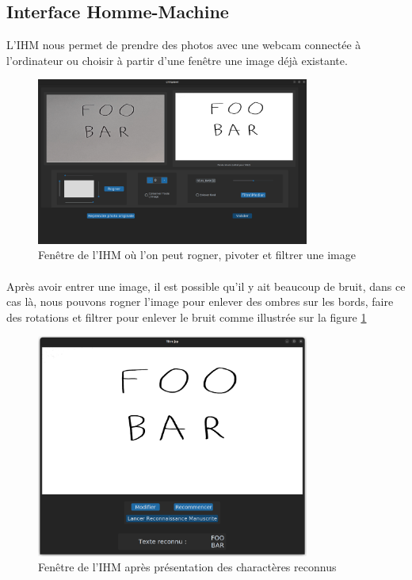 \documentclass[a4paper]{article}
\begin{document}
		\subsection{Interface Homme-Machine}
			L'IHM nous permet de prendre des photos avec une webcam connectée à l'ordinateur ou choisir à partir d'une fenêtre une image déjà existante. 
			\begin{figure}[H]
				\includegraphics[width=0.8\textwidth]{modif.png}
				\centering
				\caption{Fenêtre de l'IHM où l'on peut rogner, pivoter et filtrer une image}
				\label{fig:modif}
			\end{figure}
			\paragraph{}
				Après avoir entrer une image, il est possible qu'il y ait beaucoup de bruit, dans ce cas là, nous pouvons rogner l'image pour enlever des ombres sur les bords, faire des rotations et filtrer pour enlever le bruit comme illustrée sur la figure \ref{fig:modif}
			\begin{figure}[H]
				\includegraphics[width=0.8\textwidth]{recon.png}
				\centering
				\caption{Fenêtre de l'IHM après présentation des charactères reconnus}
				\label{fig:recon}
			\end{figure}
\end{document}
